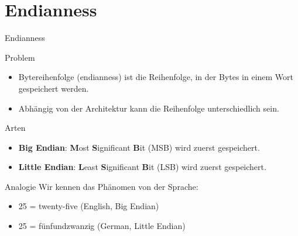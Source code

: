 \documentclass[xelatex,aspectratio=169]{beamer}
\begin{document}
\section{Endianness}
\begin{frame}{Endianness}
    \begin{alertblock}{Problem}
        \begin{itemize}
            \item Bytereihenfolge (endianness) ist die Reihenfolge, in der Bytes in einem Wort gespeichert werden.
            \item Abhängig von der Architektur kann die Reihenfolge unterschiedlich sein.
        \end{itemize}
    \end{alertblock}
    \begin{block}{Arten}
        \begin{itemize}
            \item \textbf{Big Endian}: \textbf{M}ost \textbf{S}ignificant \textbf{B}it (MSB) wird zuerst gespeichert.
            \item \textbf{Little Endian}: \textbf{L}east \textbf{S}ignificant \textbf{B}it (LSB) wird zuerst gespeichert.
        \end{itemize}
    \end{block}
    \begin{exampleblock}{Analogie}
        Wir kennen das Phänomen von der Sprache:
        \begin{itemize}
            \item 25 = twenty-five (English, Big Endian)
            \item 25 = fünfundzwanzig (German, Little Endian)
        \end{itemize}
    \end{exampleblock}
\end{frame}
\end{document}
